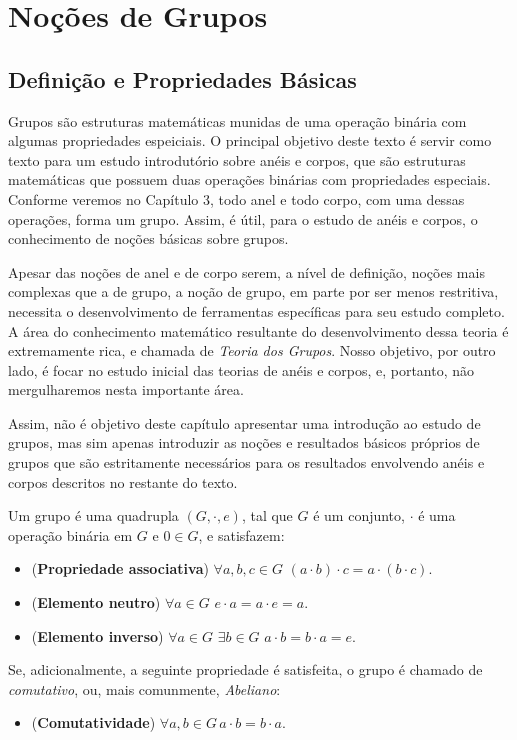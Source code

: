 \chapter{Noções de Grupos}


\section{Definição e Propriedades Básicas}

Grupos são estruturas matemáticas munidas de uma operação binária com algumas propriedades espeiciais.
O principal objetivo deste texto é servir como texto para um estudo introdutório sobre anéis e corpos, que são estruturas matemáticas que possuem duas operações binárias com propriedades especiais.
Conforme veremos no Capítulo 3, todo anel e todo corpo, com uma dessas operações, forma um grupo.
Assim, é útil, para o estudo de anéis e corpos, o conhecimento de noções básicas sobre grupos.

Apesar das noções de anel e de corpo serem, a nível de definição, noções mais complexas que a de grupo, a noção de grupo, em parte por ser menos restritiva, necessita o desenvolvimento de ferramentas específicas para seu estudo completo.
A área do conhecimento matemático resultante do desenvolvimento dessa teoria é extremamente rica, e chamada de \emph{Teoria dos Grupos}.
Nosso objetivo, por outro lado, é focar no estudo inicial das teorias de anéis e corpos, e, portanto, não mergulharemos nesta importante área.

Assim, não é objetivo deste capítulo apresentar uma introdução ao estudo de grupos, mas sim apenas introduzir as noções e resultados básicos próprios de grupos que são estritamente necessários para os resultados envolvendo anéis e corpos descritos no restante do texto.

\begin{definition}
Um grupo é uma quadrupla $(G,\cdot,e)$, tal que $G$ é um conjunto, $\cdot$ é uma operação binária em $G$ e $0 \in G$, e satisfazem:

\begin{itemize}
    \item (\textbf{Propriedade associativa}) $\forall a, b, c \in G$ $(a \cdot b) \cdot c = a \cdot (b \cdot c)$.
    \item (\textbf{Elemento neutro}) $\forall a \in G$  $e \cdot a = a \cdot e = a$.
    \item (\textbf{Elemento inverso}) $\forall a \in G$ $\exists b \in G$ $a \cdot b = b \cdot a = e$.
\end{itemize}
Se, adicionalmente, a seguinte propriedade é satisfeita, o grupo é chamado de \emph{comutativo}, ou, mais comunmente, \emph{Abeliano}:
\begin{itemize}
    \item (\textbf{Comutatividade}) $\forall a, b \in G\, a \cdot b = b \cdot a$.
\end{itemize}
\end{definition}


